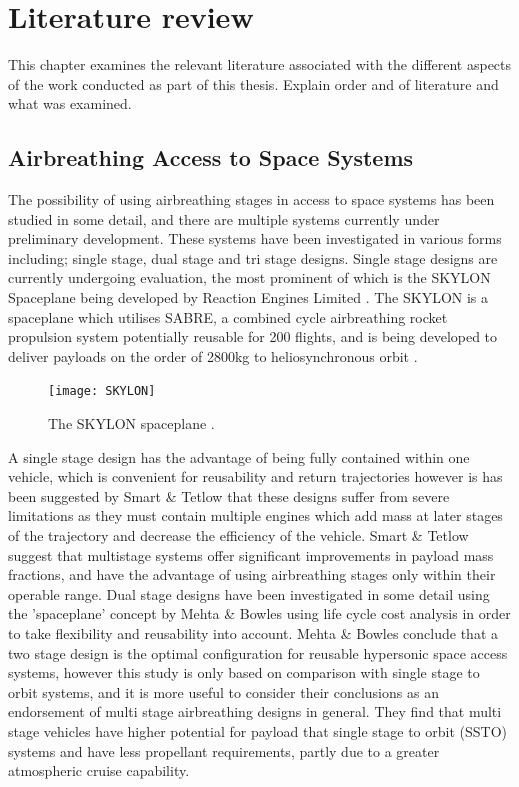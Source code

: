 
\cleardoublepage
\chapter{Literature review}\label{chapter:literature-review}

  This chapter examines the relevant literature associated with the different aspects of the work conducted as part of this thesis. Explain order and of literature and what was examined.
  
\section{Airbreathing Access to Space Systems}

The possibility of using airbreathing stages in access to space systems has been studied in some detail, and there are multiple systems currently under preliminary development. These systems have been investigated in various forms including; single stage, dual stage and tri stage designs. Single stage designs are currently undergoing evaluation, the most prominent of which is the SKYLON Spaceplane being developed by Reaction Engines Limited \cite{Varvill2004}. The SKYLON is a spaceplane which utilises SABRE, a combined cycle airbreathing rocket propulsion system potentially reusable for 200 flights, and is being developed to deliver payloads on the order of 2800kg to heliosynchronous orbit \cite{Sky-rel-ma-}.

\begin{figure}[ht]
	\centering
	\texttt{[image: SKYLON]}
	\caption{The SKYLON spaceplane \cite{Varvill2008}.}
	\label{fig:SKYLON}
\end{figure}
A single stage design has the advantage of being fully contained within one vehicle, which is convenient for reusability and return trajectories however is has been suggested by Smart \& Tetlow \cite{Smart2009} that these designs suffer from severe limitations as they must contain multiple engines which add mass at later stages of the trajectory and decrease the efficiency of the vehicle. Smart \& Tetlow suggest that multistage systems offer significant improvements in payload mass fractions, and have the advantage of using airbreathing stages only within their operable range.
Dual stage designs have been investigated in some detail using the 'spaceplane' concept by Mehta \& Bowles \cite{Mehta2001} using life cycle cost analysis in order to take flexibility and reusability into account. Mehta \& Bowles conclude that a two stage design is the optimal configuration for reusable hypersonic space access systems, however this study is only based on comparison with single stage to orbit systems, and it is more useful to consider their conclusions as an endorsement of multi stage airbreathing designs in general. They find that multi stage vehicles have higher potential for payload that single stage to orbit (SSTO) systems and have less propellant requirements, partly due to a greater atmospheric cruise capability. 




